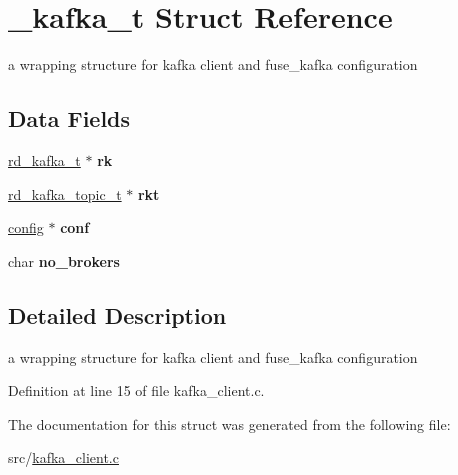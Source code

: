 \hypertarget{struct__kafka__t}{\section{\-\_\-kafka\-\_\-t \-Struct \-Reference}
\label{struct__kafka__t}
}


a wrapping structure for kafka client and fuse\-\_\-kafka configuration  


\subsection*{\-Data \-Fields}
\begin{DoxyCompactItemize}
\item 
\hypertarget{struct__kafka__t_aadfd0b7995597661f726186c612898cb}{\hyperlink{structrd__kafka__t}{rd\-\_\-kafka\-\_\-t} $\ast$ {\bfseries rk}}\label{struct__kafka__t_aadfd0b7995597661f726186c612898cb}

\item 
\hypertarget{struct__kafka__t_a9204605d0405df090d6b394803dc771a}{\hyperlink{structrd__kafka__topic__t}{rd\-\_\-kafka\-\_\-topic\-\_\-t} $\ast$ {\bfseries rkt}}\label{struct__kafka__t_a9204605d0405df090d6b394803dc771a}

\item 
\hypertarget{struct__kafka__t_a192c14b391375fc4a980ab933bee9d73}{\hyperlink{fuse__kafka_8c_aa75d2304f2d943e86dadbe603a750c9d}{config} $\ast$ {\bfseries conf}}\label{struct__kafka__t_a192c14b391375fc4a980ab933bee9d73}

\item 
\hypertarget{struct__kafka__t_a09bf8b40b524945605583e9004a02511}{char {\bfseries no\-\_\-brokers}}\label{struct__kafka__t_a09bf8b40b524945605583e9004a02511}

\end{DoxyCompactItemize}


\subsection{\-Detailed \-Description}
a wrapping structure for kafka client and fuse\-\_\-kafka configuration 

\-Definition at line 15 of file kafka\-\_\-client.\-c.



\-The documentation for this struct was generated from the following file\-:\begin{DoxyCompactItemize}
\item 
src/\hyperlink{kafka__client_8c}{kafka\-\_\-client.\-c}\end{DoxyCompactItemize}
